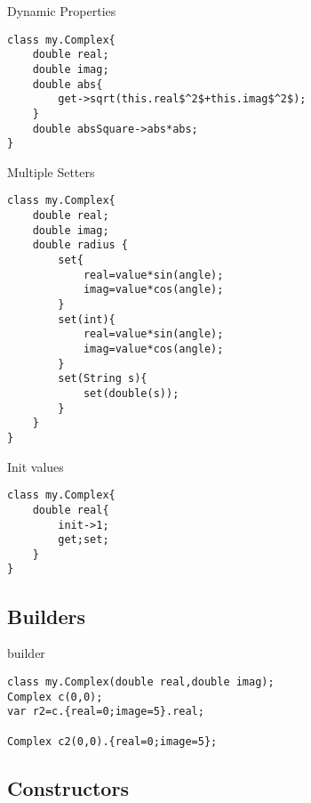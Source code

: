 \documentclass{tufte-book}
\begin{document}
            Dynamic Properties
\lstset{mathescape=true}
            \begin{lstlisting}
class my.Complex{
    double real;
    double imag;
    double abs{
        get->sqrt(this.real$^2$+this.imag$^2$);
    }
    double absSquare->abs*abs;
}
            \end{lstlisting}
\lstset{mathescape=false}

            
            Multiple Setters

\lstset{mathescape=true}
            \begin{lstlisting}
class my.Complex{
    double real;
    double imag;
    double radius {
        set{
            real=value*sin(angle);
            imag=value*cos(angle);
        }
        set(int){
            real=value*sin(angle);
            imag=value*cos(angle);
        }
        set(String s){
            set(double(s));
        }
    }
}
            \end{lstlisting}
\lstset{mathescape=false}

            Init values

\lstset{mathescape=true}
            \begin{lstlisting}
class my.Complex{
    double real{
        init->1;
        get;set;
    }
}
            \end{lstlisting}
\lstset{mathescape=false}


            \subsection{Builders}
builder
\lstset{mathescape=true}
            \begin{lstlisting}
class my.Complex(double real,double imag);
Complex c(0,0);
var r2=c.{real=0;image=5}.real;

Complex c2(0,0).{real=0;image=5};

            \end{lstlisting}
\lstset{mathescape=false}



            \subsection{Constructors}
\end{document}
